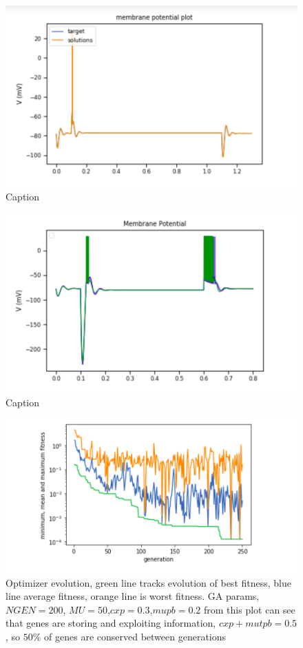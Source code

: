 

\begin{figure}
    \centering
    \includegraphics{figures/simulated_data_supra_threshold.png}
    \caption{Caption}
    \label{fig:my_label}
\end{figure}
\begin{figure}
    \centering
    \includegraphics{figures/simulated_data_sub_threshold.png}
    \caption{Caption}
    \label{fig:my_label}
\end{figure}

\begin{figure}
    \centering
  \includegraphics{figures/simulated_data_stats.png}
    \caption{Optimizer evolution, green line tracks evolution of best fitness, blue line average fitness, orange line is worst fitness. GA params, $NGEN=200$, $MU=50$,$cxp=0.3$,$mupb=0.2$ from this plot can see that genes are storing and exploiting information, $cxp+mutpb=0.5$, so $50\%$ of genes are conserved between generations }
    \label{fig:my_label}
\end{figure}

